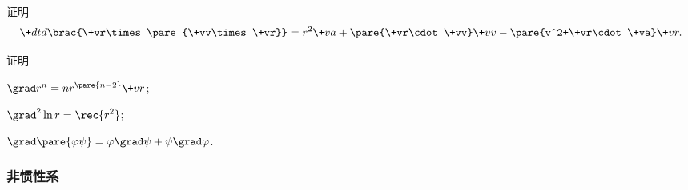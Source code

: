 \documentclass[../LectureNotes.tex]{subfiles}
\begin{document}
\begin{cenum}
    \item 证明
    \[ \+dtd{}\brac{\+vr\times\pare{\+vv\times\+vr}} = r^2\+va + \pare{\+vr\cdot\+vv}\+vv - \pare{v^2+\+vr\cdot\+va}\+vr. \]
    \item 证明
    \begin{cenum}
        \item $\grad r^n = nr^{\pare{n-2}}\+vr$;
        \item $\laplacian \ln r = \displaystyle\rec{r^2}$;
        \item $\grad\pare{\varphi\psi} = \varphi\grad\psi + \psi\grad\varphi$.
    \end{cenum}
\end{cenum}


\subsubsection{非惯性系} %
\label{ssub:非惯性系}
\end{document}
